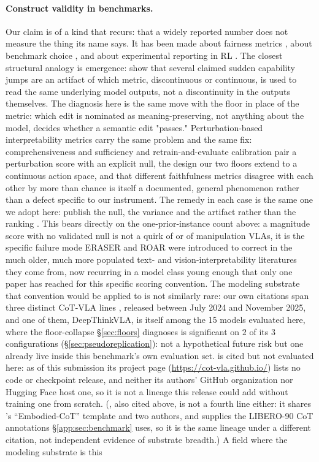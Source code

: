 \documentclass{article}
\begin{document}
\paragraph{Construct validity in benchmarks.} Our claim is of a kind that recurs: that a widely reported number does not measure the thing its name says. It has been made about fairness metrics \citep{jacobs2021}, about benchmark choice \citep{dehghani2021,raji2021}, and about experimental reporting in RL \citep{henderson2018,dodge2019,pineau2021}. The closest structural analogy is emergence: \citet{schaeffer2023} show that several claimed sudden capability jumps are an artifact of which metric, discontinuous or continuous, is used to read the same underlying model outputs, not a discontinuity in the outputs themselves. The diagnosis here is the same move with the floor in place of the metric: which edit is nominated as meaning-preserving, not anything about the model, decides whether a semantic edit "passes." Perturbation-based interpretability metrics carry the same problem and the same fix: comprehensiveness and sufficiency \citep{eraser} and retrain-and-evaluate calibration \citep{roar} pair a perturbation score with an explicit null, the design our two floors extend to a continuous action space, and that different faithfulness metrics disagree with each other by more than chance is itself a documented, general phenomenon \citep{krishna2022,chan2022faithfulness} rather than a defect specific to our instrument. The remedy in each case is the same one we adopt here: publish the null, the variance and the artifact rather than the ranking \citep{lipton2016}. This bears directly on the one-prior-instance count above: a magnitude score with no validated null is not a quirk of \citet{vladrivebench} or of manipulation VLAs, it is the specific failure mode ERASER and ROAR were introduced to correct in the much older, much more populated text- and vision-interpretability literatures they come from, now recurring in a model class young enough that only one paper has reached for this specific scoring convention. The modeling substrate that convention would be applied to is not similarly rare: our own citations span three distinct CoT-VLA lines \citep{ecot,cotvla,deepthinkvla}, released between July 2024 and November 2025, and one of them, DeepThinkVLA, is itself among the 15 models evaluated here, where the floor-collapse \S\ref{sec:floors} diagnoses is significant on $2$ of its $3$ configurations (\S\ref{sec:pseudoreplication}): not a hypothetical future risk but one already live inside this benchmark's own evaluation set. \citet{cotvla} is cited but not evaluated here: as of this submission its project page (\url{https://cot-vla.github.io/}) lists no code or checkpoint release, and neither its authors' GitHub organization nor Hugging Face host one, so it is not a lineage this release could add without training one from scratch. (\citet{ecotlite}, also cited above, is not a fourth line either: it shares \citet{ecot}'s ``Embodied-CoT'' template and two authors, and supplies the LIBERO-90 CoT annotations \S\ref{app:sec:benchmark} uses, so it is the same lineage under a different citation, not independent evidence of substrate breadth.) A field where the modeling substrate is this 
\end{document}
